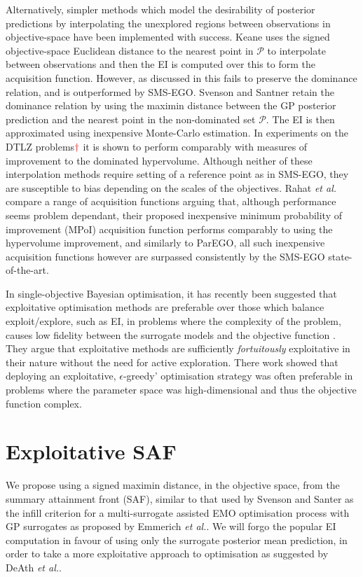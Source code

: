 \documentclass[conference]{IEEEtran}
\makeatletter
\newcommand\smsego{SMS-EGO\xspace}
\newcommand\ei{EI\xspace}
\newcommand\gp{GP\xspace}
\newcommand\maximin{maximin\xspace}
\newcommand{\mnote}[2][\textcolor{red}{\dagger}]{$#1$\marginpar{\color{red}\raggedright\tiny$#1$
    #2}}
\newcommand*{\etal}{\textit{et al.}\@\xspace}
\makeatother
\begin{document}
Alternatively, simpler methods which model the desirability of posterior predictions by interpolating the unexplored regions between observations in objective-space have been implemented with success. Keane \cite{keane2006statistical} uses the signed objective-space Euclidean distance to the nearest point in $\mathcal{P}$ to interpolate between observations and then the \ei is computed over this to form the acquisition function. However, as discussed in \cite{wagner2010expected} this fails to preserve the dominance relation, and is outperformed by \smsego. Svenson and Santner  \cite{svenson2016multiobjective} retain the dominance relation by using the maximin distance between the \gp posterior prediction and the nearest point in the non-dominated set $\mathcal{P}$. The \ei is then approximated using inexpensive Monte-Carlo estimation. In experiments on the DTLZ problems\mnote{give citation} it is shown to perform comparably with measures of improvement to the dominated hypervolume. Although neither of these interpolation methods require setting of a reference point as in \smsego, they are susceptible to bias depending on the scales of the objectives. Rahat \etal \cite{rahat2017alternative} compare a range of acquisition functions arguing that, although performance seems problem dependant, their proposed inexpensive minimum probability of improvement (MPoI) acquisition function performs comparably to using the hypervolume improvement, and similarly to ParEGO, all such inexpensive acquisition functions however are surpassed consistently by the \smsego state-of-the-art.

In single-objective Bayesian optimisation, it has recently been suggested that exploitative optimisation methods are preferable over those which balance exploit/explore, such as \ei, in problems where the complexity of the problem, causes low fidelity between the surrogate models and the objective function \cite{death2019greed}. They argue that exploitative methods are sufficiently \textit{fortuitously} exploitative in their nature without the need for active exploration. There work showed that deploying an exploitative, $\epsilon$-greedy' optimisation strategy was often preferable in problems where the parameter space was high-dimensional and thus the objective function complex.



\section{Exploitative SAF}\label{section:our_method}
We propose using a signed \maximin distance, in the objective space, from the summary attainment front (SAF), similar to that used by Svenson and Santer \cite{svenson2016multiobjective} as the infill criterion for a multi-surrogate assisted EMO optimisation process with \gp surrogates as proposed by Emmerich \etal \cite{emmerich2006single}. We will forgo the popular \ei computation in favour of using only the surrogate posterior mean prediction, in order to take a more exploitative approach to optimisation as suggested by DeAth \etal \cite{death2019greed}. 
\end{document}
